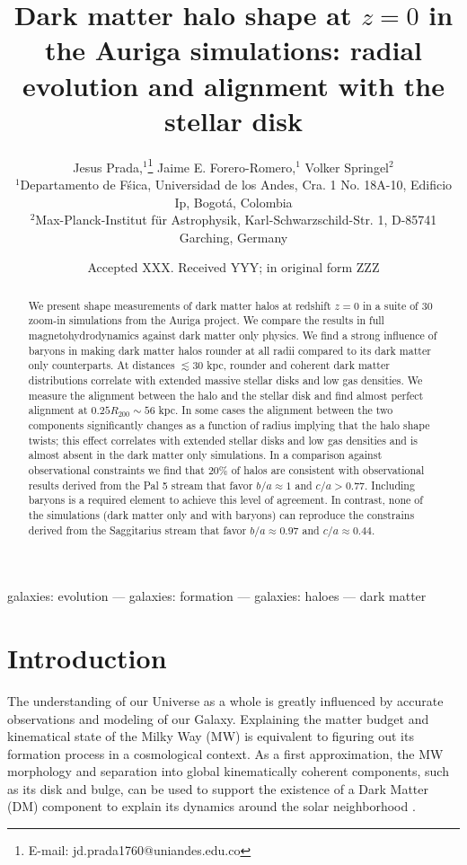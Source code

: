 \documentclass[a4paper,fleqn,usenatbib]{mnras}
\title[The shape of dark matter haloes at $z=0$ in Auriga]
{Dark matter halo shape at $z=0$ in the Auriga simulations: radial
  evolution and alignment with the stellar disk}
\author[Jesus Prada,  Jaime E. Forero-Romero, Volker Springel ]{
Jesus Prada,$^{1}$\thanks{E-mail: jd.prada1760@uniandes.edu.co}
Jaime E. Forero-Romero,$^{1}$
Volker Springel$^{2}$
\\
$^{1}$Departamento de F\'sica, Universidad de los Andes, Cra. 1 No.
18A-10, Edificio Ip, Bogot\'a, Colombia\\
$^{2}$Max-Planck-Institut f\"ur Astrophysik, Karl-Schwarzschild-Str. 1, D-85741 Garching, Germany\\
}
\date{Accepted XXX. Received YYY; in original form ZZZ}
\begin{document}
\label{firstpage}
\pagerange{\pageref{firstpage}--\pageref{lastpage}}
\maketitle

\begin{abstract}
We present shape measurements of dark matter halos at redshift $z=0$
in a suite of 30 zoom-in simulations from the Auriga project. 
We compare the results in full magnetohydrodynamics against dark
matter only physics. 
We find a strong influence of baryons in making dark matter halos
rounder at all radii compared to its dark matter only counterparts.
At distances $\lesssim 30$ kpc, rounder and coherent dark matter
distributions correlate with extended massive stellar disks and low gas
densities.  
We measure the alignment between the halo and the stellar disk and
find almost perfect alignment at $0.25R_{200}\sim56$ kpc.   
In some cases the alignment between the two components significantly
changes as a function of radius implying that the halo shape twists;
this effect correlates with extended stellar disks and
low gas densities and is almost absent in the dark matter only
simulations.  
In a comparison against observational constraints  we find that $20\%$
of halos are consistent with observational results derived
from the Pal 5 stream that favor $b/a\approx 1$ and
$c/a>0.77$. Including baryons is a required element to achieve this
level of agreement. In contrast, none of the simulations (dark matter
only and with baryons) can reproduce the constrains derived from the
Saggitarius stream that favor $b/a\approx 0.97$ and $c/a\approx0.44$.
\end{abstract}

\begin{keywords}
galaxies: evolution --- galaxies: formation --- galaxies: haloes ---
dark matter
\end{keywords}



\section{Introduction}

The understanding of our Universe as a whole is greatly influenced by
accurate observations and modeling of our Galaxy. 
Explaining the matter budget and kinematical state of the Milky Way
(MW) is  equivalent to figuring out its formation process in a
cosmological context. 
As a first approximation, the MW morphology and
separation into global kinematically coherent components, such as its
disk and bulge, can be used to support the  existence of a Dark Matter
(DM) component to explain its dynamics around the solar neighborhood
\citep{2000MNRAS.311..361O,2009PASJ...61..227S,2010JCAP...08..004C,2013ApJ...779..115B,Iocco15}. 
\end{document}
